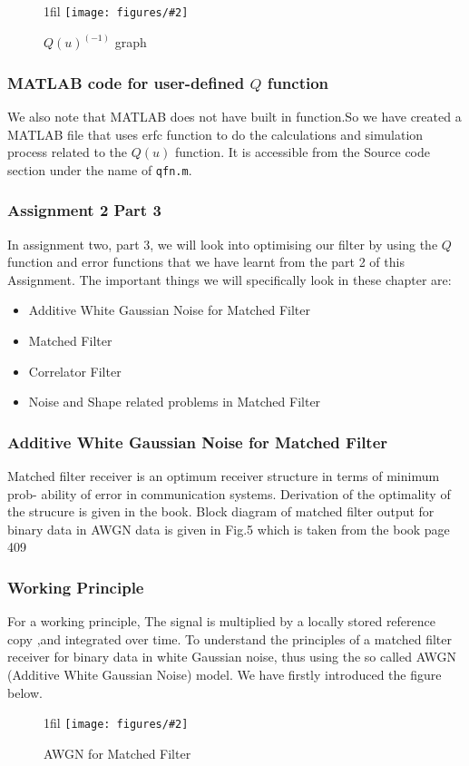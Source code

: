 \documentclass{beamer}
\makeatletter
\newcommand{\code}[1]{\texttt{#1}}
\newcommand*{\centerfloat}{%
  \parindent \z@
  \leftskip \z@ \@plus 1fil \@minus \textwidth
  \rightskip\leftskip
  \parfillskip \z@skip}
\newcommand{\fig}[3]{
  \begin{figure}[H]
  \centerfloat
    \texttt{[image: figures/\#2]}
    \caption{#3}
  \end{figure}
}
\makeatother
\begin{document}
\begin{frame}
	\fig{5cm}{fig7.png}{$Q(u)^(-1)$ graph}
\end{frame}

\begin{frame}
	\frametitle{MATLAB code for user-defined $Q$ function}
We also note that MATLAB does not have built in function.So we have created a MATLAB file that uses erfc function to do the calculations and simulation process related to the $Q(u)$ function. It is accessible from the Source code section under the name of \code{qfn.m}.
\end{frame}

\begin{frame}
	\frametitle { Assignment 2 Part 3}
In assignment two, part 3, we will look into optimising our filter by using the $Q$ function and error functions that we have learnt from the part 2 of this Assignment. The important things we will specifically look in these chapter are:
\begin{itemize}
	\item Additive White Gaussian Noise for Matched Filter
	\item Matched Filter
	\item Correlator Filter
	\item Noise and Shape related problems in Matched Filter
\end{itemize}
\end{frame}

\begin{frame}
	\frametitle{Additive White Gaussian Noise for Matched Filter}

Matched filter receiver is an optimum receiver structure in terms of minimum prob- ability of error in communication systems. Derivation of the optimality of the strucure is given in the book. Block diagram of matched filter output for binary data in AWGN data is given in Fig.5 which is taken from the book page 409

\end{frame}
	
\begin{frame}
	\frametitle{Working Principle}
For a working principle, The signal is multiplied by a locally stored reference copy ,and integrated over time.
To understand the principles of a matched filter receiver for binary data in white Gaussian noise, thus using the so called AWGN (Additive White Gaussian Noise) model. We have firstly introduced the figure below.
\fig{5cm}{figure_31.png}{AWGN for Matched Filter}
\end{frame}
\end{document}
